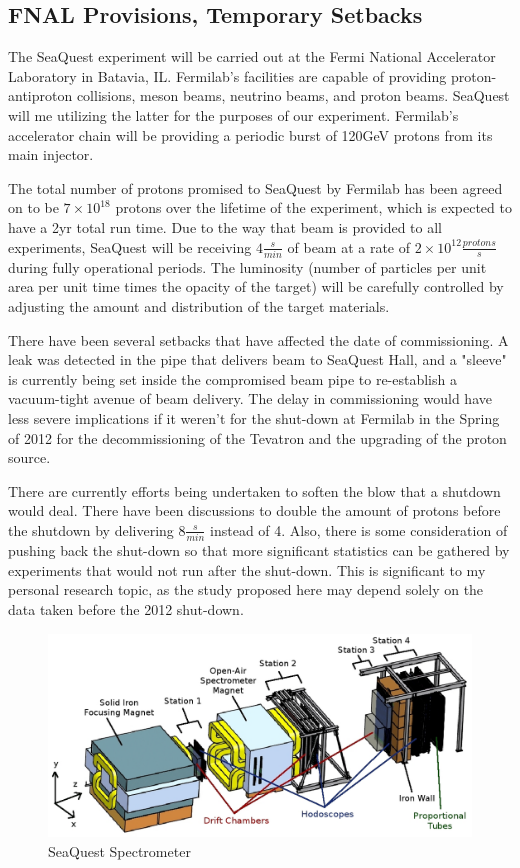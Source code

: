 \documentclass[11pt]{article}
\begin{document}
\subsection{FNAL Provisions, Temporary Setbacks}

The SeaQuest experiment will be carried out at the Fermi National Accelerator Laboratory in Batavia, IL.  Fermilab's facilities are capable of providing proton-antiproton collisions, meson beams, neutrino beams, and proton beams.  SeaQuest will me utilizing the latter for the purposes of our experiment.  Fermilab's accelerator chain will be providing a periodic burst of 120GeV protons from its main injector.  

The total number of protons promised to SeaQuest by Fermilab has been agreed on to be $7 \times 10^{18}$ protons over the lifetime of the experiment, which is expected to have a 2yr total run time.  Due to the way that beam is provided to all experiments, SeaQuest will be receiving $4\frac{s}{min}$ of beam at a rate of $2 \times 10^{12} \frac{protons}{s}$ during fully operational periods.  The luminosity  (number of particles per unit area per unit time times the opacity of the target) will be carefully controlled by adjusting the amount and distribution of the target materials.

There have been several setbacks that have affected the date of commissioning.  A leak was detected in the pipe that delivers beam to SeaQuest Hall, and a "sleeve" is currently being set inside the compromised beam pipe to re-establish a vacuum-tight avenue of beam delivery.  The delay in commissioning would have less severe implications if it weren't for the shut-down at Fermilab in the Spring of 2012 for the decommissioning of the Tevatron and the upgrading of the proton source.

There are currently efforts being undertaken to soften the blow that a shutdown would deal.  There have been discussions to double the amount of protons before the shutdown by delivering $8 \frac{s}{min}$ instead of 4.  Also, there is some consideration of pushing back the shut-down so that more significant statistics can be gathered by experiments that would not run after the shut-down.  This is significant to my personal research topic, as the study proposed here may depend solely on the data taken before the 2012 shut-down.

  \begin{figure}
  \centerline{
    \mbox{\includegraphics[width=5.00in]{E906_Spectrometer.jpg}}
  }
  \caption{SeaQuest Spectrometer}
  \label{fig:spectrometer}
  \end{figure}
\end{document}
